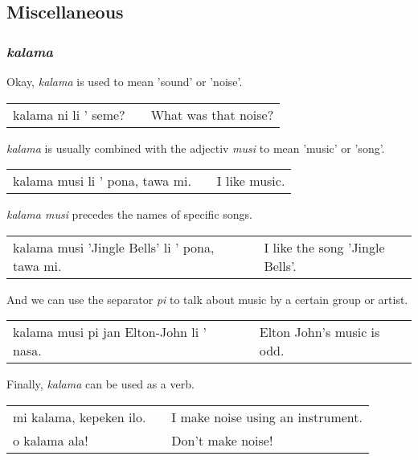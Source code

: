 %
\subsection*{Miscellaneous}
%
\subsubsection*{\textit{kalama}}
%
Okay, \textit{kalama} is used to mean 'sound' or 'noise'.  

\begin{supertabular}{p{5,5cm}|ll}
kalama ni li ' seme? && What was that noise? \\
\end{supertabular}  

\textit{kalama} is usually combined with the adjectiv \textit{musi} to mean 'music' or 'song'. 

\begin{supertabular}{p{5,5cm}|ll}
kalama musi li ' pona, tawa mi. && I like music. \\
\end{supertabular}  

\textit{kalama musi} precedes the names of specific songs. 

\begin{supertabular}{p{5,5cm}|ll}
kalama musi 'Jingle Bells' li ' pona, tawa mi. && I like the song 'Jingle Bells'. \\
\end{supertabular}  

And we can use the separator \textit{pi} to talk about music by a certain group or artist. 

\begin{supertabular}{p{5,5cm}|ll}
kalama musi pi jan Elton-John li ' nasa. && Elton John's music is odd. \\
\end{supertabular}  

Finally, \textit{kalama} can be used as a verb.

\begin{supertabular}{p{5,5cm}|ll}
mi kalama, kepeken ilo. && I make noise using an instrument. \\
o kalama ala! && Don't make noise! \\
\end{supertabular}  
%
